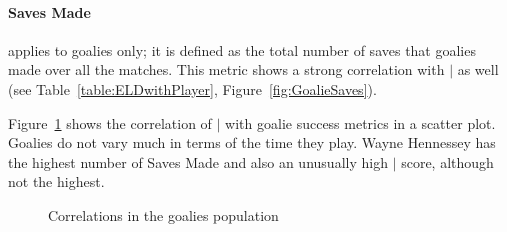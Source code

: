 		
		
		\paragraph{Saves Made} applies to goalies only; it is defined as the total number of saves that goalies made over all the matches. This metric shows a strong correlation with $\mid$ as well (see Table~\ref{table:ELDwithPlayer}, Figure~\ref{fig:GoalieSaves}).  
		
		Figure~\ref{fig:goaliesELD} shows the correlation of $\mid$ with goalie success metrics in a scatter plot. Goalies do not vary much in terms of the time they play. Wayne Hennessey has the highest number of Saves Made and also an unusually high $\mid$ score, although not the highest. 
		
		
		
		\begin{figure}
			\centering     %
			\caption{Correlations in the goalies population\label{fig:goaliesELD}}
		\end{figure}
		
